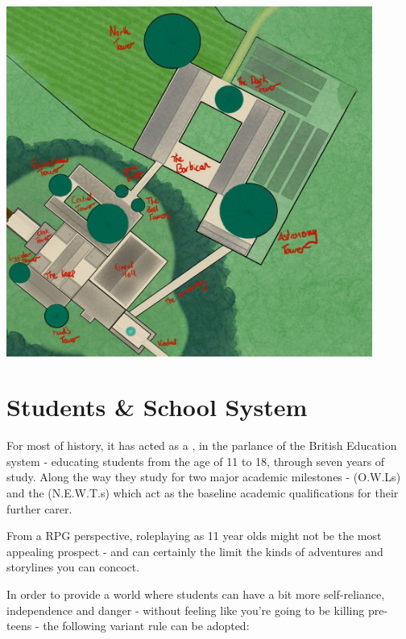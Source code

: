 \begin{strip}
	\begin{center}
	\includegraphics[keepaspectratio = true, width = 0.9\textwidth]{../Images/HogwartsLabelled}
	\end{center}
\end{strip}


\section{Students \& School System}

For most of  history, it has acted as a , in the parlance of the British Education system - educating students from the age of 11 to 18, through seven years of study. Along the way they study for two major academic milestones -  (O.W.Ls) and the  (N.E.W.T.s) which act as the baseline academic qualifications for their further carer. 



From a RPG perspective, roleplaying as 11 year olds might not be the most appealing prospect - and can certainly the limit the kinds of adventures and storylines you can concoct. 

In order to provide a world where students can have a bit more self-reliance, independence and danger - without feeling like you're going to be killing pre-teens - the following variant rule can be adopted:  

